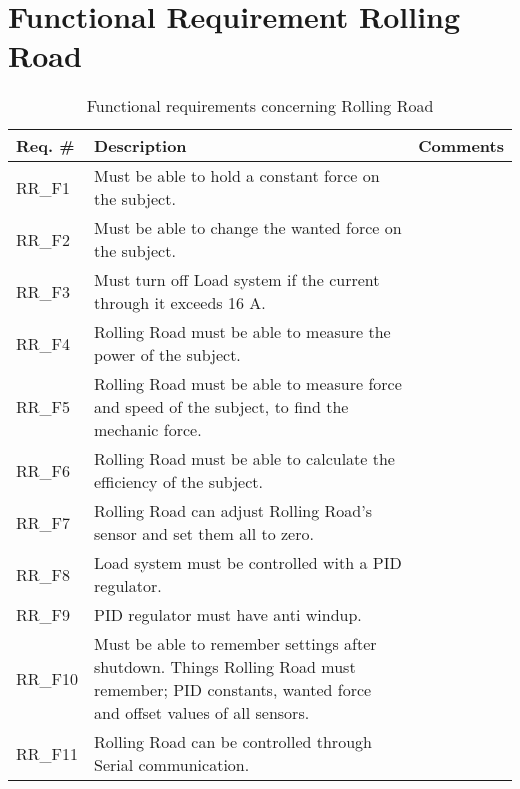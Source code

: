\section{Functional Requirement Rolling Road}

\begin{table}[h!]
	\label{FREQ_AU2}
	\centering
	\begin{tabular}{|p{2 cm}|p{10 cm}|p{2 cm}|}
		\hline
		\textbf{Req. \#} & \textbf{Description} & \textbf{Comments} \\\hline
		RR\_F1
		& Must be able to hold a constant force on the subject.
		&  \\ \hline
		RR\_F2
		& Must be able to change the wanted force on the subject. 
		&  \\ \hline
		RR\_F3
		& Must turn off Load system if the current through it exceeds 16 A.
		&  \\ \hline
		RR\_F4
		& Rolling Road must be able to measure the power of the subject.
		&  \\ \hline
		RR\_F5
		& Rolling Road must be able to measure force and speed of the subject, to find the mechanic force.
		&  \\ \hline
		RR\_F6
		& Rolling Road must be able to calculate the efficiency of the subject. 
		&  \\ \hline
		RR\_F7
		& Rolling Road can adjust Rolling Road's sensor and set them all to zero. 
		&  \\ \hline
		RR\_F8
		& Load system must be controlled with a PID regulator.
		&  \\ \hline
		RR\_F9
		& PID regulator must have anti windup.
		&  \\ \hline
		RR\_F10
		& Must be able to remember settings after shutdown. Things Rolling Road must remember; PID constants, wanted force and offset values of all sensors.
		&  \\ \hline
		RR\_F11
		& Rolling Road can be controlled through Serial communication.  
		&  \\ \hline
	\end{tabular}
	\caption{Functional requirements concerning Rolling Road}
\end{table}
